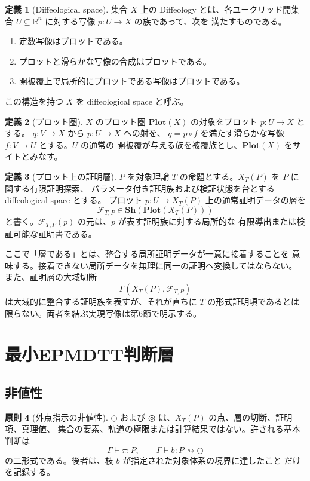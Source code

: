\documentclass[a4paper,11pt]{ltjsarticle}
\theoremstyle{definition}
\newtheorem{definition}{定義}[section]
\newtheorem{principle}[definition]{原則}
\theoremstyle{plain}
\newcommand{\dfix}{\mathord{\text{○}}}
\newcommand{\udfix}{\mathord{\text{◎}}}
\newcommand{\Sh}{\mathbf{Sh}}
\newcommand{\Plot}{\mathbf{Plot}}
\newcommand{\1}{\mathbf{1}}
\begin{document}
\begin{definition}[Diffeological space]
集合 $X$ 上の Diffeology とは、各ユークリッド開集合
$U\subseteq\mathbb R^n$ に対する写像 $p:U\to X$ の族であって、次を
満たすものである。
\begin{enumerate}
 \item 定数写像はプロットである。
 \item プロットと滑らかな写像の合成はプロットである。
 \item 開被覆上で局所的にプロットである写像はプロットである。
\end{enumerate}
この構造を持つ $X$ を diffeological space と呼ぶ。
\end{definition}

\begin{definition}[プロット圏]
$X$ のプロット圏 $\Plot(X)$ の対象をプロット $p:U\to X$ とする。
$q:V\to X$ から $p:U\to X$ への射を、
$q=p\circ f$ を満たす滑らかな写像 $f:V\to U$ とする。$U$ の通常の
開被覆が与える族を被覆族とし、$\Plot(X)$ をサイトとみなす。
\end{definition}

\begin{definition}[プロット上の証明層]
$P$ を対象理論 $T$ の命題とする。$X_T(P)$ を $P$ に関する有限証明探索、
パラメータ付き証明族および検証状態を台とする diffeological space とする。
プロット $p:U\to X_T(P)$ 上の通常証明データの層を
\[
 \mathcal F_{T,P}\in\Sh(\Plot(X_T(P)))
\]
と書く。$\mathcal F_{T,P}(p)$ の元は、$p$ が表す証明族に対する局所的な
有限導出または検証可能な証明書である。
\end{definition}

ここで「層である」とは、整合する局所証明データが一意に接着することを
意味する。接着できない局所データを無理に同一の証明へ変換してはならない。
また、証明層の大域切断
\[
 \Gamma(X_T(P),\mathcal F_{T,P})
\]
は大域的に整合する証明族を表すが、それが直ちに $T$ の形式証明項であるとは
限らない。両者を結ぶ実現写像は第6節で明示する。

\section{最小EPMDTT判断層}

\subsection{非値性}

\begin{principle}[外点指示の非値性]\label{pr:nonvalue}
$\dfix$ および $\udfix$ は、$X_T(P)$ の点、層の切断、証明項、真理値、
集合の要素、軌道の極限または計算結果ではない。許される基本判断は
\[
 \Gamma\vdash \pi:P,
 \qquad
 \Gamma\vdash b:P\rightsquigarrow\dfix
\]
の二形式である。後者は、枝 $b$ が指定された対象体系の境界に達したこと
だけを記録する。
\end{principle}
\end{document}
